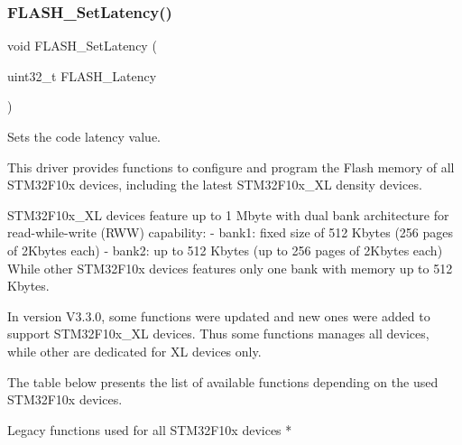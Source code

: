 \subsubsection{\texorpdfstring{F\+L\+A\+S\+H\+\_\+\+Set\+Latency()}{FLASH\_SetLatency()}}
{\footnotesize\ttfamily void F\+L\+A\+S\+H\+\_\+\+Set\+Latency (\begin{DoxyParamCaption}\item[{uint32\+\_\+t}]{F\+L\+A\+S\+H\+\_\+\+Latency }\end{DoxyParamCaption})}



Sets the code latency value. 


\begin{DoxyCode}
This driver provides functions to configure and program the Flash memory of all STM32F10x devices,
including the latest STM32F10x\_XL density devices. 

STM32F10x\_XL devices feature up to 1 Mbyte with dual bank architecture \textcolor{keywordflow}{for} read-\textcolor{keywordflow}{while}-write (RWW) 
      capability:
   - bank1: fixed size of 512 Kbytes (256 pages of 2Kbytes each)
   - bank2: up to 512 Kbytes (up to 256 pages of 2Kbytes each)
While other STM32F10x devices features only one bank with memory up to 512 Kbytes.

In version V3.3.0, some functions were updated and \textcolor{keyword}{new} ones were added to support
STM32F10x\_XL devices. Thus some functions manages all devices, \textcolor{keywordflow}{while} other are 
dedicated \textcolor{keywordflow}{for} XL devices only.

The table below presents the list of available functions depending on the used STM32F10x devices.  
     
                                                     
    Legacy functions used \textcolor{keywordflow}{for} all STM32F10x devices *
                                                     

\end{DoxyCode}
